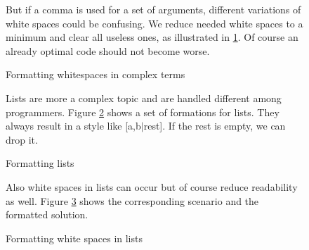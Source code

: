 \documentclass{article}
\begin{document}
 
\begin{figure}[h]
But if a comma is used for a set of arguments, different variations of white spaces could be confusing. We reduce needed white spaces to a minimum and clear all useless ones, as illustrated in \ref{lst:complextTermWhitspace}. Of course an already optimal code should not become worse.\\


\begin{minipage}{.5\textwidth}

\end{minipage}
\hfill
\begin{minipage}{.5\textwidth}

\end{minipage}

\caption{Formatting whitespaces in complex terms}
\label{lst:complextTermWhitspace}
\end{figure}



\begin{figure}[h]
Lists are more a complex topic and are handled different among programmers. Figure \ref{lst:lists} shows a set of formations for lists. They always result in a style like [a,b$|$rest]. If the rest is empty, we can drop it.\\

\begin{minipage}{.5\textwidth}

\end{minipage}
\hfill
\begin{minipage}{.5\textwidth}

\end{minipage}

\caption{Formatting lists}
\label{lst:lists}
\end{figure}


\begin{figure}[h]
Also white spaces in lists can occur but of course reduce readability as well. Figure \ref{lst:listWithesaces} shows the corresponding scenario and the formatted solution.\\

\begin{minipage}{.5\textwidth}

\end{minipage}
\hfill
\begin{minipage}{.5\textwidth}

\end{minipage}

\caption{Formatting white spaces in lists}
\label{lst:listWithesaces}
\end{figure}
\end{document}
